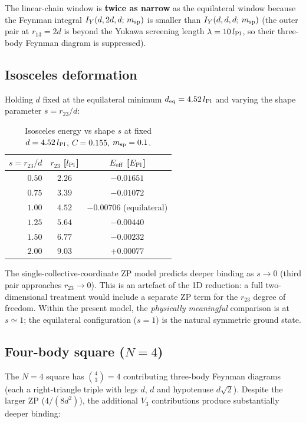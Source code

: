 \noindent
The linear-chain window is \textbf{twice as narrow} as the equilateral
window because the Feynman integral $I_Y(d,2d,d;\,m_{\rm sp})$ is
smaller than $I_Y(d,d,d;\,m_{\rm sp})$ (the outer pair at $r_{13}=2d$
is beyond the Yukawa screening length $\lambda=10\,l_{\rm Pl}$, so
their three-body Feynman diagram is suppressed).

\subsection{Isosceles deformation}

Holding $d$ fixed at the equilateral minimum $d_{\rm eq}=4.52\,l_{\rm Pl}$
and varying the shape parameter $s=r_{23}/d$:

\begin{table}[h]
\centering
\caption{Isosceles energy vs shape $s$ at fixed $d=4.52\,l_{\rm Pl}$,
$C=0.155$, $m_{\rm sp}=0.1$.}
\label{tab:isosceles}
\begin{tabular}{rcc}
\hline
$s = r_{23}/d$ & $r_{23}$ [$l_{\rm Pl}$] & $E_{\rm eff}$ [$E_{\rm Pl}$] \\
\hline
$0.50$ & $2.26$ & $-0.01651$ \\
$0.75$ & $3.39$ & $-0.01072$ \\
$1.00$ & $4.52$ & $-0.00706$ \quad (equilateral) \\
$1.25$ & $5.64$ & $-0.00440$ \\
$1.50$ & $6.77$ & $-0.00232$ \\
$2.00$ & $9.03$ & $+0.00077$ \\
\hline
\end{tabular}
\end{table}

\noindent
The single-collective-coordinate ZP model predicts deeper binding as
$s\to 0$ (third pair approaches $r_{23}\to 0$).  This is an artefact of
the 1D reduction: a full two-dimensional treatment would include a
separate ZP term for the $r_{23}$ degree of freedom.  Within the
present model, the \emph{physically meaningful} comparison is at
$s\simeq 1$; the equilateral configuration ($s=1$) is the natural
symmetric ground state.

\subsection{Four-body square ($N=4$)}

The $N=4$ square has $\binom{4}{3}=4$ contributing three-body Feynman
diagrams (each a right-triangle triple with legs $d$, $d$ and
hypotenuse $d\sqrt{2}$).  Despite the larger ZP ($4/(8d^2)$), the
additional $V_3$ contributions produce substantially deeper binding:

